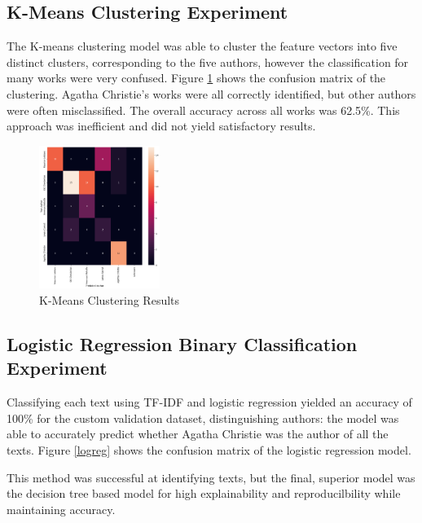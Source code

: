 \documentclass[journal]{IEEEtran} %
\begin{document}
\subsection{K-Means Clustering Experiment}

The K-means clustering model was able to cluster the feature vectors into five distinct clusters, corresponding to the five authors, however the classification for many works were very confused. Figure \ref{kmeans} shows the confusion matrix of the clustering.
Agatha Christie's works were all correctly identified, but other authors were often misclassified. The overall accuracy across all works was 62.5\%. This approach was inefficient and did not yield satisfactory results.

\begin{figure}[h!]
    \caption{K-Means Clustering Results}
    \begin{center}
    \centerline{\includegraphics[width=0.35\textwidth]{./kmeans.png}}
    \end{center}
    \centering
    \label{kmeans}
\end{figure}

\subsection{Logistic Regression Binary Classification Experiment}

Classifying each text using TF-IDF and logistic regression yielded an accuracy of 100\% for the custom validation dataset, distinguishing authors: the model was able to accurately predict whether Agatha Christie was the author of all the texts. Figure \ref{logreg} shows the confusion matrix of the logistic regression model.

This method was successful at identifying texts, but the final, superior model was the decision tree based model for high explainability and reproducilbility while maintaining accuracy.
\end{document}
